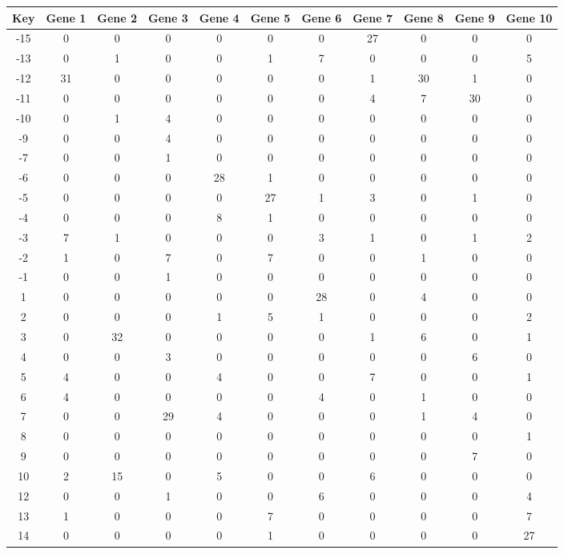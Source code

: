 \begin{tabular}{|c|c|c|c|c|c|c|c|c|c|c|}
\hline
Key & Gene 1 & Gene 2 & Gene 3 & Gene 4 & Gene 5 & Gene 6 & Gene 7 & Gene 8 & Gene 9 & Gene 10 \\
\hline
-15 & 0 & 0 & 0 & 0 & 0 & 0 & 27 & 0 & 0 & 0 \\
-13 & 0 & 1 & 0 & 0 & 1 & 7 & 0 & 0 & 0 & 5 \\
-12 & 31 & 0 & 0 & 0 & 0 & 0 & 1 & 30 & 1 & 0 \\
-11 & 0 & 0 & 0 & 0 & 0 & 0 & 4 & 7 & 30 & 0 \\
-10 & 0 & 1 & 4 & 0 & 0 & 0 & 0 & 0 & 0 & 0 \\
-9 & 0 & 0 & 4 & 0 & 0 & 0 & 0 & 0 & 0 & 0 \\
-7 & 0 & 0 & 1 & 0 & 0 & 0 & 0 & 0 & 0 & 0 \\
-6 & 0 & 0 & 0 & 28 & 1 & 0 & 0 & 0 & 0 & 0 \\
-5 & 0 & 0 & 0 & 0 & 27 & 1 & 3 & 0 & 1 & 0 \\
-4 & 0 & 0 & 0 & 8 & 1 & 0 & 0 & 0 & 0 & 0 \\
-3 & 7 & 1 & 0 & 0 & 0 & 3 & 1 & 0 & 1 & 2 \\
-2 & 1 & 0 & 7 & 0 & 7 & 0 & 0 & 1 & 0 & 0 \\
-1 & 0 & 0 & 1 & 0 & 0 & 0 & 0 & 0 & 0 & 0 \\
1 & 0 & 0 & 0 & 0 & 0 & 28 & 0 & 4 & 0 & 0 \\
2 & 0 & 0 & 0 & 1 & 5 & 1 & 0 & 0 & 0 & 2 \\
3 & 0 & 32 & 0 & 0 & 0 & 0 & 1 & 6 & 0 & 1 \\
4 & 0 & 0 & 3 & 0 & 0 & 0 & 0 & 0 & 6 & 0 \\
5 & 4 & 0 & 0 & 4 & 0 & 0 & 7 & 0 & 0 & 1 \\
6 & 4 & 0 & 0 & 0 & 0 & 4 & 0 & 1 & 0 & 0 \\
7 & 0 & 0 & 29 & 4 & 0 & 0 & 0 & 1 & 4 & 0 \\
8 & 0 & 0 & 0 & 0 & 0 & 0 & 0 & 0 & 0 & 1 \\
9 & 0 & 0 & 0 & 0 & 0 & 0 & 0 & 0 & 7 & 0 \\
10 & 2 & 15 & 0 & 5 & 0 & 0 & 6 & 0 & 0 & 0 \\
12 & 0 & 0 & 1 & 0 & 0 & 6 & 0 & 0 & 0 & 4 \\
13 & 1 & 0 & 0 & 0 & 7 & 0 & 0 & 0 & 0 & 7 \\
14 & 0 & 0 & 0 & 0 & 1 & 0 & 0 & 0 & 0 & 27 \\
\hline
\end{tabular}